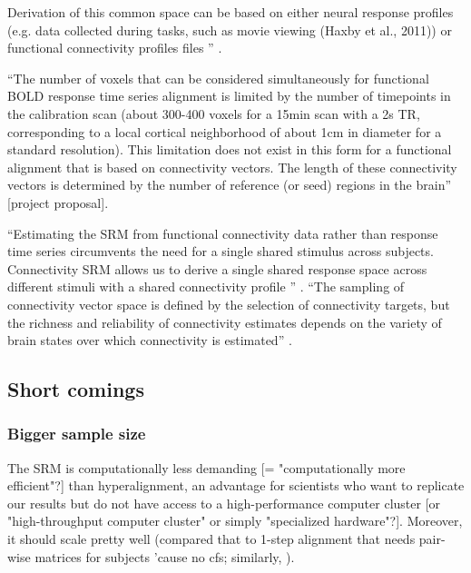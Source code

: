 %
Derivation of this common space can be based on either neural response profiles
(e.g. data collected during tasks, such as movie viewing (Haxby et al., 2011))
or functional connectivity profiles files \citep{guntupalli2018computational}''
\citep{busch2021hybrid}.

%
``The number of voxels that can be considered simultaneously for functional BOLD
response time series alignment is limited by the number of timepoints in the
calibration scan (about 300-400 voxels for a 15min scan with a 2s TR,
corresponding to a local cortical neighborhood of about 1cm in diameter for a
standard resolution).
%
This limitation does not exist in this form for a functional alignment that is
based on connectivity vectors.
%
The length of these connectivity vectors is determined by the number of
reference (or seed) regions in the brain'' [project proposal].

``Estimating the SRM from functional connectivity data rather than response time
series circumvents the need for a single shared stimulus across subjects.
%
Connectivity SRM allows us to derive a single shared response space across
different stimuli with a shared connectivity profile
\citep{nastase2019leveraging}'' \citep{kumar2020brainiak}.
%
``The sampling of connectivity vector space is defined by the selection of
connectivity targets, but the richness and reliability of connectivity estimates
depends on the variety of brain states over which connectivity is estimated''
\citep{haxby2020hyperalignment}.


\subsection{Short comings}


\subsubsection{Bigger sample size}

%
The SRM is computationally less demanding [= "computationally more efficient"?]
than hyperalignment, an advantage for scientists who want to replicate our
results but do not have access to a high-performance computer cluster [or
"high-throughput computer cluster" or simply "specialized hardware"?].
%
Moreover, it should scale pretty well (compared that to
\citep{jiahui2020predicting, jiahui2022cross} 1-step alignment that needs
pair-wise matrices for subjects 'cause no \ac{cfs}; similarly,
\citep{busch2021hybrid}).



